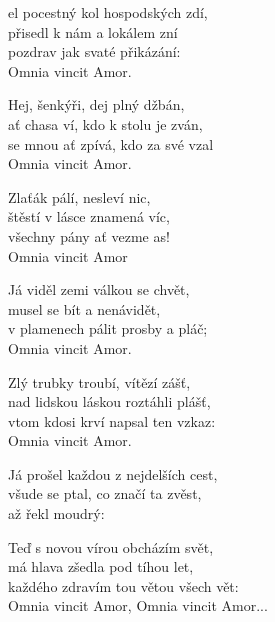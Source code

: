 
\ve{}
el pocestný kol hospodských zdí,\\
přisedl k nám a lokálem zní\\
pozdrav jak svaté přikázání:\\
Omnia vincit Amor. 

\vspace{-0.1cm}
\ve{}
Hej, šenkýři, dej plný džbán,\\
ať chasa ví, kdo k stolu je zván,\\
se mnou ať zpívá, kdo za své vzal\\
Omnia vincit Amor. 

\cho{}
Zlaťák pálí, nesleví nic,\\
štěstí v lásce znamená víc,\\
všechny pány ať vezme as! \\
Omnia vincit Amor 

\vspace{-0.1cm}
\ve{}
Já viděl zemi válkou se chvět,\\
musel se bít a nenávidět,\\
v plamenech pálit prosby a pláč;\\
Omnia vincit Amor. 

\ve{}
Zlý trubky troubí, vítězí zášť,\\
nad lidskou láskou roztáhli plášť,\\
vtom kdosi krví napsal ten vzkaz:\\
Omnia vincit Amor. 

\cho{} 

\vspace{-0.1cm}
\ve{}
Já prošel každou z nejdelších cest,\\
všude se ptal, co značí ta zvěst,\\
až řekl moudrý:  

\cho{}

\vspace{-0.1cm}
\ve{}
Teď s novou vírou obcházím svět,\\
má hlava zšedla pod tíhou let,\\
každého zdravím tou větou všech vět:\\
Omnia vincit Amor, Omnia vincit Amor... 

\esong
